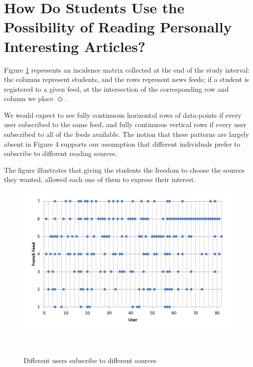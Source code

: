
\newpage
\section{How Do Students Use the Possibility of Reading Personally Interesting Articles?}
\label{sec:results}

Figure \ref{fig:registrations} represents an incidence matrix collected at the end of the study interval: the columns represent students, and the rows represent news feeds; if a student is registered to a given feed, at the intersection of the corresponding row and column we place $\Diamond$. 

We would expect to see fully continuous horizontal rows of data-points if every user subscribed to the same feed, and fully continuous vertical rows if every user subscribed to all of the feeds available. The notion that these patterns are largely absent in Figure 4 supports our assumption that different individuals prefer to subscribe to different reading sources.

The figure illustrates that giving the students the freedom to choose the sources they wanted, allowed each one of them to express their interest. 

\begin{figure}[h!]
\centering
  \includegraphics[width=\columnwidth]{figures/users_feeds}
  \caption{Different users subscribe to different sources}~\label{fig:registrations}
\end{figure}

